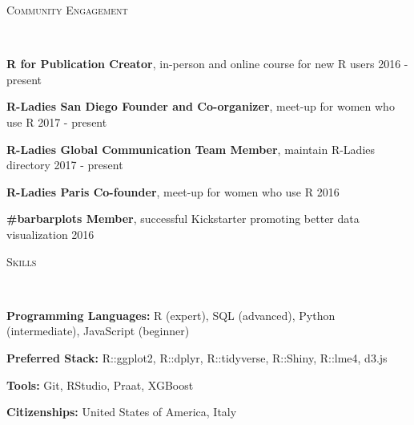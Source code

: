 \documentclass[9pt]{article}
\newenvironment{changemargin}[2]{%
  \begin{list}{}{%
    \setlength{\topsep}{0pt}%
    \setlength{\leftmargin}{#1}%
    \setlength{\rightmargin}{#2}%
    \setlength{\listparindent}{\parindent}%
    \setlength{\itemindent}{\parindent}%
    \setlength{\parsep}{\parskip}%
  }%
  \item[]}{\end{list}
}
\newcommand{\lineover}{
	\begin{changemargin}{-0.05in}{-0.05in}
		\vspace*{-8pt}
		\hrulefill \\
		\vspace*{-2pt}
	\end{changemargin}
}
\newcommand{\header}[1]{
	\begin{changemargin}{-0.5in}{-0.5in}
		\scshape{#1}\\
  	\lineover
	\end{changemargin}
}
\newenvironment{body} {
	\vspace*{-16pt}
	\begin{changemargin}{-0.25in}{-0.5in}
  }	
	{\end{changemargin}
}
\begin{document}
\header{\color{red}Community Engagement}

\begin{body}
	\vspace{14pt}
	
	\textbf{R for Publication Creator}, in-person and online course for new R users \hfill 2016 - present\\
	\medskip
	
	\textbf{R-Ladies San Diego Founder and Co-organizer}, meet-up for women who use R \hfill 2017 - present\\
	\medskip
	
	\textbf{R-Ladies Global Communication Team Member}, maintain R-Ladies directory \hfill 2017 - present\\
	\medskip
	
	\textbf{R-Ladies Paris Co-founder}, meet-up for women who use R \hfill 2016\\
	\medskip

	\textbf{\#barbarplots Member}, successful Kickstarter promoting better data visualization \hfill 2016\\
	\medskip
		
\end{body}

\smallskip

\header{\color{red}Skills}

\begin{body}
	\vspace{14pt}
	
	
	\textbf{Programming Languages:} R (expert), SQL (advanced), Python (intermediate), JavaScript (beginner)\
	\medskip

	\textbf{Preferred Stack:} R::ggplot2, R::dplyr, R::tidyverse, R::Shiny, R::lme4, d3.js\\
	\medskip
	
	\textbf{Tools:} Git, RStudio, Praat, XGBoost
	\medskip
	
	\textbf{Citizenships:} United States of America, Italy\\
	\medskip

\end{body}
\end{document}
